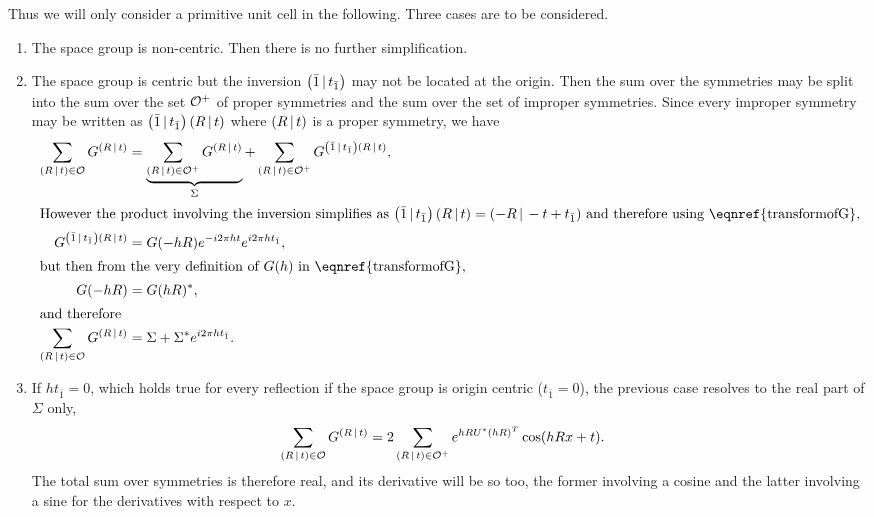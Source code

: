 \documentclass[pdf]{iucr}
\begin{document}
Thus we will only consider a primitive unit cell in the following. Three cases are to be considered.
\begin{enumerate}
\item The space group is non-centric. Then there is no further simplification.
\item The space group is centric but the inversion $\left( \bar{1}\,\vert\, t_{\bar{1}} \right)$ may not be located at the origin. Then the sum over the symmetries may be split into the sum over the set $\cal{O}^+$ of proper symmetries and the sum over the set of  improper symmetries. Since every improper symmetry may be written as $\left( \bar{1}\,\vert\, t_{\bar{1}} \right)\left( R\,\vert\, t \right)$ where $\left( R\,\vert\, t \right)$ is a proper symmetry, we have
\begin{align}
\sum_{\sym{R}{t} \in \cal{O}} G^{\sym{R}{t}} &= 
\underbrace{\sum_{\sym{R}{t} \in \cal{O^+}} G^{\sym{R}{t}} }_{\Sigma} 
+ \sum_{\sym{R}{t} \in \cal{O}^+} G^{\inversion \sym{R}{t}}, \nonumber \\
\intertext{However the product involving the inversion simplifies as 
$\inversion\sym{R}{t} = \sym{-R}{-t + t_{\bar{1}}}$ and therefore using \eqnref{transformofG},}
G^{\inversion\sym{R}{t}} &= G(-hR) e^{-i2\pi ht} e^{i2\pi h t_{\bar{1}}}, \nonumber \\
 \intertext{but then from the very definition of $G(h)$ in \eqnref{transformofG},}
 G(-hR) &= G(hR)^*, \\
 \intertext{and therefore}
 \sum_{\sym{R}{t} \in \cal{O}} G^{\sym{R}{t}} &= \Sigma + \Sigma^* e^{i2\pi h t_{\bar{1}}}.
 \label{eqn:sumofGforcentricgroups}
\end{align}

\item If $h t_{\bar{1}}=0$, which holds true for every reflection if the space group is origin centric ($t_{\bar{1}}=0$), the previous case resolves to the real part of $\Sigma$ only,
\begin{align}
 \sum_{\left( R\,\vert\, t \right) \in \cal{O}} G^{\left( R\,\vert\, t \right)} & = 2 \sum_{\left( R\,\vert\, t \right) \in \cal{O}^+}  e^{h R U^* (hR)^T} \cos(hRx + t).
\end{align}
The total sum over symmetries is therefore real, and its derivative will be so too, the former involving a cosine and the latter involving a sine for the derivatives with respect to $x$. 
\end{enumerate}
\end{document}

